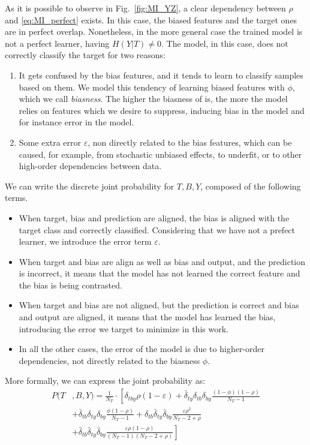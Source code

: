 As it is possible to observe in Fig.~\ref{fig:MI_YZ}, a clear dependency between $\rho$ and \eqref{eq:MI_perfect} exists. In this case, the biased features and the target ones are in perfect overlap. Nonetheless, in the more general case the trained model is not a perfect learner, having $H(Y|T) \neq 0$.
The model, in this case, does not correctly classify the target for two reasons:
\begin{enumerate}
	\item It gets confused by the bias features, and it tends to learn to classify samples based on them. We model this tendency of learning biased features with $\phi$, which we call \emph{biasness}. The higher the biasness of is, the more the model relies on features which we desire to suppress, inducing bias in the model and for instance error in the model.
	\item Some extra error $\varepsilon$, non directly related to the bias features, which can be caused, for example, from stochastic unbiased effects, to underfit, or to other high-order dependencies between data. %
\end{enumerate}
We can write the discrete joint probability for $T, B, Y$, composed of the following terms.
\begin{itemize}
    \item When target, bias and prediction are aligned, the bias is aligned with the target class and correctly classified. Considering that we have not a prefect learner, we introduce the error term $\varepsilon$.
    \item When target and bias are align as well as bias and output, and the prediction is incorrect, it means that the model has not learned the correct feature and the bias is being contrasted.
    \item When target and bias are not aligned, but the prediction is correct and bias and output are aligned, it means that the model has learned the bias, introducing the error we target to minimize in this work.
    \item In all the other cases, the error of the model is due to higher-order dependencies, not directly related to the biasness $\phi$.
\end{itemize}
More formally, we can express the joint probability as:
\begin{align}
	P(T&,B,Y) = \frac{1}{N_T} \cdot \left[\delta_{tby} \rho (1 - \varepsilon) + \bar{\delta}_{ty}\delta_{tb}\delta_{by} \frac{(1-\phi)(1-\rho)}{N_T-1} \nonumber \right .\nonumber \\[1em]
	&+ \bar{\delta}_{tb}\delta_{ty}\delta_{by}\frac{\phi(1-\rho)}{N_T-1} + \delta_{tb}\bar{\delta}_{ty}\bar{\delta}_{by} \frac{\varepsilon \rho^2}{N_T-2+\rho} \nonumber \\[1em]
	&\left . + \bar{\delta}_{tb}\bar{\delta}_{ty}\bar{\delta}_{by} \frac{\varepsilon \rho (1-\rho)}{(N_T-1)(N_T-2+\rho)} \right]
    \label{eq:Pjointtotal}
\end{align}
